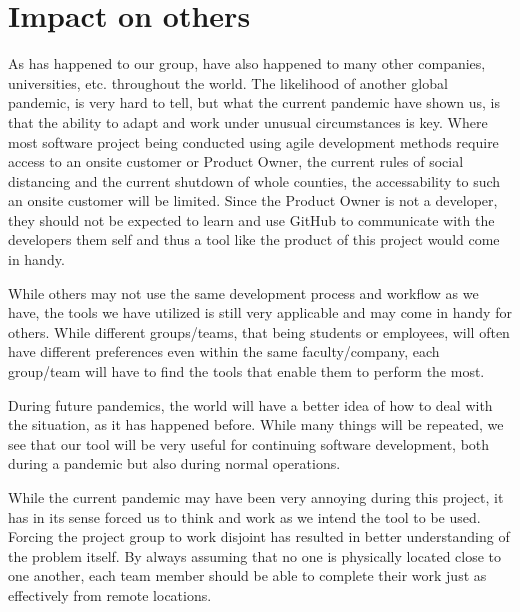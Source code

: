 \section{Impact on others}
As has happened to our group, have also happened to many other companies, universities, etc. throughout the world.
The likelihood of another global pandemic, is very hard to tell, but what the current pandemic have shown us, is that the ability to adapt and work under unusual circumstances is key.
Where most software project being conducted using agile development methods require access to an onsite customer or Product Owner, the current rules of social distancing and the current shutdown of whole counties, the accessability to such an onsite customer will be limited.
Since the Product Owner is not a developer, they should not be expected to learn and use GitHub to communicate with the developers them self and thus a tool like the product of this project would come in handy.

While others may not use the same development process and workflow as we have, the tools we have utilized is still very applicable and may come in handy for others.
While different groups/teams, that being students or employees, will often have different preferences even within the same faculty/company, each group/team will have to find the tools that enable them to perform the most.

During future pandemics, the world will have a better idea of how to deal with the situation, as it has happened before.
While many things will be repeated, we see that our tool will be very useful for continuing software development, both during a pandemic but also during normal operations.

While the current pandemic may have been very annoying during this project, it has in its sense forced us to think and work as we intend the tool to be used.
Forcing the project group to work disjoint has resulted in better understanding of the problem itself.
By always assuming that no one is physically located close to one another, each team member should be able to complete their work just as effectively from remote locations.
